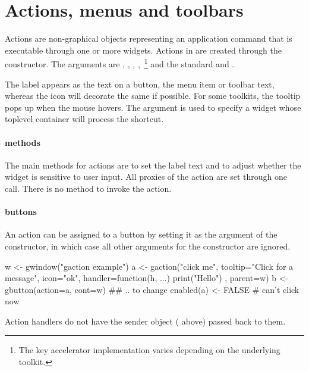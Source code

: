 \section{Actions, menus and toolbars}
\label{sec:gWidgets-acti-menus-toolb}


Actions are non-graphical objects representing an application command
that is executable through one or more widgets. Actions in
 are created through the 
constructor. The arguments are ,
, ,
,~\footnote{The key accelerator
  implementation varies depending on the underlying toolkit. }
 and the standard
 and . 

The label appears as the text on a button, the menu item or toolbar
text, whereas the icon will decorate the same if possible. For some
toolkits, the tooltip pops up when the mouse hovers. The  argument is used to
specify a widget whose toplevel container will process the shortcut.

\paragraph{methods}
The main methods for actions are  to
set the label text and  to adjust
whether the widget is sensitive to user input. All proxies of the
action are set through one call. There is no method to invoke the action.

\paragraph{buttons}
An action can be assigned to a button by setting it as the
 argument of the  constructor,
in which case all other arguments for the constructor are ignored.

\begin{Schunk}
\begin{Sinput}
 w <- gwindow("gaction example")
 a <- gaction("click me", tooltip="Click for a message", 
              icon="ok", 
              handler=function(h, ...) {
                print("Hello")
              },
              parent=w)
 b <- gbutton(action=a, cont=w)
 ## .. to change
 enabled(a) <- FALSE                     # can't click now
\end{Sinput}
\end{Schunk}
Action handlers do not have the sender object ( above)
passed back to them.

